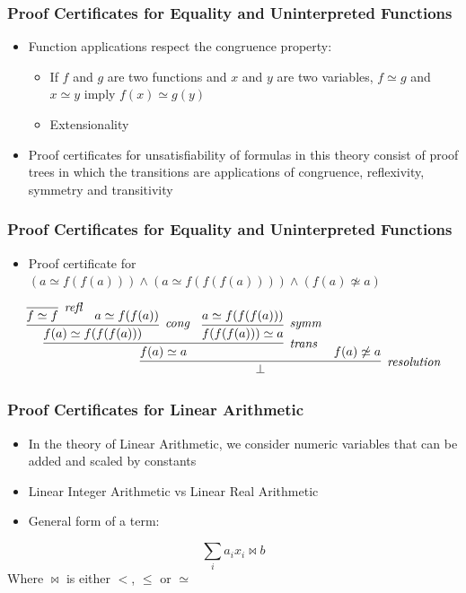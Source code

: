 \documentclass[usepdftitle=false,aspectratio=169,usenames,dvipsnames]{beamer}
\newcommand\vitem{\vfill\item}
\begin{document}
\begin{frame}
  \frametitle{Proof Certificates for Equality and Uninterpreted Functions}
  \begin{itemize}
    \item Function applications respect the congruence property:
    \begin{itemize}
      \item If $f$ and $g$ are two functions and $x$ and $y$ are two variables, $f \simeq g$ and $x \simeq y$ imply $f(x) \simeq g(y)$
      \item Extensionality
    \end{itemize}
    \vitem Proof certificates for unsatisfiability of formulas in this theory consist of proof trees in which the transitions are applications of congruence, reflexivity, symmetry and transitivity
  \end{itemize}
\end{frame}

\begin{frame}
  \frametitle{Proof Certificates for Equality and Uninterpreted Functions}
  \begin{itemize}
    \item Proof certificate for $(a \simeq f(f(a))) \wedge (a \simeq f(f(f(a)))) \wedge (f(a) \not\simeq a)$
  \end{itemize}
  \vfill
  \[
    \infer[\textit{resolution}]{\bot}{\infer[\textit{trans}]{f(a) \simeq a}{\infer[\textit{cong}]{f(a) \simeq f(f(f(a)))}{\infer[\textit{refl}]{f \simeq f}{} & a \simeq f(f(a))} & \infer[\textit{symm}]{f(f(f(a))) \simeq a}{a \simeq f(f(f(a)))}} & f(a) \not\simeq a}
  \]
\end{frame}

\begin{frame}
  \frametitle{Proof Certificates for Linear Arithmetic}
  \begin{itemize}
    \item In the theory of Linear Arithmetic, we consider numeric variables that can be added and scaled by constants
    \vitem Linear Integer Arithmetic vs Linear Real Arithmetic
    \vitem General form of a term:
  \end{itemize}
  \[
    \sum_{i} a_{i} x_{i} \bowtie b
  \]
  Where $\bowtie$ is either $<$, $\le$ or $\simeq$
\end{frame}
\end{document}
